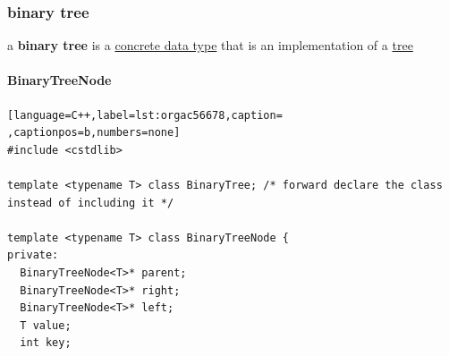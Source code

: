 \documentclass[a4paper,12pt]{article}
\begin{document}
\subsubsection{binary tree}
\label{sec:org254f5f7}
\begin{definition}
a \textbf{binary tree} is a \hyperref[sec:org39a1299]{concrete data type} that is an implementation of a \hyperref[sec:org6b67a14]{tree}\\[0pt]
\end{definition}
\paragraph{BinaryTreeNode}
\label{sec:org7736646}
\begin{lstlisting}[language=C++,label=lst:orgac56678,caption= ,captionpos=b,numbers=none]
#include <cstdlib>

template <typename T> class BinaryTree; /* forward declare the class instead of including it */

template <typename T> class BinaryTreeNode {
private:
  BinaryTreeNode<T>* parent;
  BinaryTreeNode<T>* right;
  BinaryTreeNode<T>* left;
  T value;
  int key;


\end{lstlisting}
\end{document}
